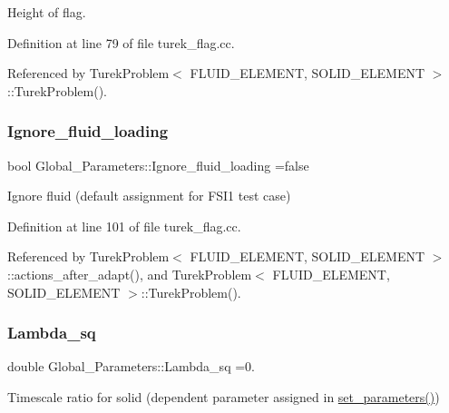 Height of flag. 



Definition at line 79 of file turek\+\_\+flag.\+cc.



Referenced by Turek\+Problem$<$ F\+L\+U\+I\+D\+\_\+\+E\+L\+E\+M\+E\+N\+T, S\+O\+L\+I\+D\+\_\+\+E\+L\+E\+M\+E\+N\+T $>$\+::\+Turek\+Problem().

\mbox{\label{namespaceGlobal__Parameters_aac13d615d2acd78d22a3137ffd62f7aa}} 
\subsubsection{\texorpdfstring{Ignore\+\_\+fluid\+\_\+loading}{Ignore\_fluid\_loading}}
{\footnotesize\ttfamily bool Global\+\_\+\+Parameters\+::\+Ignore\+\_\+fluid\+\_\+loading =false}



Ignore fluid (default assignment for F\+S\+I1 test case) 



Definition at line 101 of file turek\+\_\+flag.\+cc.



Referenced by Turek\+Problem$<$ F\+L\+U\+I\+D\+\_\+\+E\+L\+E\+M\+E\+N\+T, S\+O\+L\+I\+D\+\_\+\+E\+L\+E\+M\+E\+N\+T $>$\+::actions\+\_\+after\+\_\+adapt(), and Turek\+Problem$<$ F\+L\+U\+I\+D\+\_\+\+E\+L\+E\+M\+E\+N\+T, S\+O\+L\+I\+D\+\_\+\+E\+L\+E\+M\+E\+N\+T $>$\+::\+Turek\+Problem().

\mbox{\label{namespaceGlobal__Parameters_a3e3428638f89f970fcf2148b0bab1465}} 
\subsubsection{\texorpdfstring{Lambda\+\_\+sq}{Lambda\_sq}}
{\footnotesize\ttfamily double Global\+\_\+\+Parameters\+::\+Lambda\+\_\+sq =0.}



Timescale ratio for solid (dependent parameter assigned in \hyperlink{namespaceGlobal__Parameters_a8c333f9041cad78d5c0160a8e2c169f5}{set\+\_\+parameters()}) 



